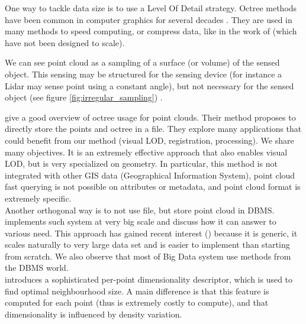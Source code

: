         
        
		One way to tackle data size is to use a Level Of Detail strategy. Octree methods have been common in computer graphics for several decades \citep{Meagher1982}. They are used in many methods to speed computing, or compress data, like in the work of \cite{Schnabel2006,Huang2006} (which have not been designed to scale).
		
		
		We can see point cloud as a sampling of a surface (or volume) of the sensed object. This sensing may be structured for the sensing device (for instance a Lidar may sense point using a constant angle), but not necessary for the sensed object (see figure \ref{fig:irregular_sampling})
		.
		
		\cite{Elseberg2013} give a good overview of octree usage for point clouds. Their method proposes to directly store the points and octree in a file. They explore many applications that could benefit from our method (visual LOD, registration, processing). We share many objectives. It is an extremely effective approach that also enables visual LOD, but is very specialized on geometry. In particular, this method is not integrated with other GIS data (Geographical Information System), point cloud fast querying is not possible on attributes or metadata, and point cloud format is extremely specific.
		\\
		Another orthogonal way is to not use file, but store point cloud in DBMS.  \cite{vanOosterom2014} implements such system at very big scale and discuss how it can answer to various need. This approach has gained recent interest (\cite{pgPointCloud2014}) because it is generic, it scales naturally to very large data set and is easier to implement than starting from scratch. We also observe that most of Big Data system use methods from the DBMS world.
		\\ 
		\cite{Demantke2014} introduces a sophisticated per-point dimensionality descriptor, which is used to find optimal neighbourhood size. A main difference is that this feature is computed for each point (thus is extremely costly to compute), and that dimensionality is influenced by density variation.
		
